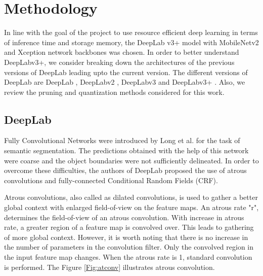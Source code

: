 \chapter{Methodology}

In line with the goal of the project to use resource efficient deep learning in terms of inference time and storage memory, the DeepLab v3+ model with MobileNetv2 \cite{DBLP:journals/corr/abs-1801-04381} and Xception \cite{DBLP:journals/corr/Chollet16a} network backbones was chosen. In order to better understand DeepLabv3+, we consider breaking down the architectures of the previous versions of DeepLab leading upto the current version. The different versions of DeepLab are DeepLab \cite{DBLP:journals/corr/ChenPKMY14}, DeepLabv2 \cite{DBLP:journals/corr/ChenPK0Y16}, DeepLabv3 \cite{DBLP:journals/corr/ChenPSA17} and DeepLabv3+ \cite{DBLP:journals/corr/abs-1802-02611}. Also, we review the pruning and quantization methods considered for this work.

\section{DeepLab}

Fully Convolutional Networks \cite{7298965} were introduced by Long et al. for the task of semantic segmentation. The predictions obtained with the help of this network were coarse and the object boundaries were not sufficiently delineated. In order to overcome these difficulties, the authors of DeepLab proposed the use of atrous convolutions and fully-connected Conditional Random Fields (CRF).

Atrous convolutions, also called as dilated convolutions, is used to gather a better global context with enlarged field-of-view on the feature maps. An atrous rate "r", determines the field-of-view of an atrous convolution. With increase in atrous rate, a greater region of a feature map is convolved over. This leads to gathering of more global context. However, it is worth noting that there is no increase in the number of parameters in the convolution filter. Only the convolved region in the input feature map changes. When the atrous rate is 1, standard convolution is performed. The Figure \ref{Fig:atconv} illustrates atrous convolution. 

